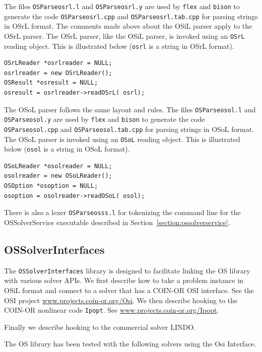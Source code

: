 \documentclass[11pt]{article}
\renewcommand{\_}{{\char"5F}}
\renewcommand{\{}{{\char"7B}}
\renewcommand{\}}{{\char"7D}}
\renewcommand{\^}{{\char"0D}}
\renewcommand{\'}{{\char"0D}}
\newif\ifknitro \knitrofalse    %
\begin{document}
\begin{enumerate}[Step 1:]
The files {\tt OSParseosrl.l} and {\tt OSParseosrl.y} are used by {\tt flex} and {\tt bison} to  generate the code 
{\tt OSParseosrl.cpp} and {\tt OSParseosrl.tab.cpp} for parsing strings in OSrL format. The comments made above about the 
OSiL parser apply to the OSrL parser. The OSrL parser, like the OSiL parser, is invoked using an {\tt OSrL} reading object.
This is illustrated below ({\tt osrl} is a string in OSrL format).
\begin{verbatim}
OSrLReader *osrlreader = NULL;
osrlreader = new OSrLReader();
OSResult *osresult = NULL;
osresult = osrlreader->readOSrL( osrl);
\end{verbatim}

The OSoL parser follows the same layout and rules.
The files {\tt OSParseosol.l} and {\tt OSParseosol.y} are used by {\tt flex} and {\tt bison} to  generate the code 
{\tt OSParseosol.cpp} and {\tt OSParseosol.tab.cpp} for parsing strings in OSoL format. The OSoL parser
is invoked using an {\tt OSoL} reading object.
This is illustrated below ({\tt osol} is a string in OSoL format).
\begin{verbatim}
OSoLReader *osolreader = NULL;
osolreader = new OSoLReader();
OSOption *osoption = NULL;
osoption = osolreader->readOSoL( osol);
\end{verbatim}


There is also a lexer {\tt OSParseosss.l} for tokenizing the command line for the OSSolverService executable described in Section~\ref{section:ossolverservice}.



\subsection{OSSolverInterfaces}\label{section:ossolverinterfaces}


The {\tt OSSolverInterfaces} library is designed to facilitate linking the OS library with various solver APIs.
We first describe how to take a problem instance in OSiL format and connect to a solver 
that has a COIN-OR OSI interface. See the OSI project \url{www.projects.coin-or.org/Osi}.
We then describe hooking to the COIN-OR nonlinear code {\tt Ipopt}. 
See \url{www.projects.coin-or.org/Ipopt}.
\ifknitro
Finally we describe hooking to two commercial solvers Knitro\index{Knitro} and LINDO\index{LINDO}.
\else
Finally we describe hooking to the commercial solver LINDO.
\fi
The OS library has been tested with the following solvers using the Osi Interface.


\end{enumerate}
\end{document}

